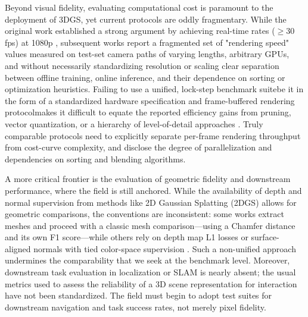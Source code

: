 \documentclass[11pt,a4paper]{article}
\begin{document}
Beyond visual fidelity, evaluating computational cost is paramount to the deployment of 3DGS, yet current protocols are oddly fragmentary. While the original work established a strong argument by achieving real-time rates ($\geq$30 fps) at 1080p \cite{arxiv:2308.04079v1}, subsequent works report a fragmented set of "rendering speed" values measured on test-set camera paths of varying lengths, arbitrary GPUs, and without necessarily standardizing resolution or scaling clear separation between offline training, online inference, and their dependence on sorting or optimization heuristics. Failing to use a unified, lock-step benchmark suitebe it in the form of a standardized hardware specification and frame-buffered rendering protocolmakes it difficult to equate the reported efficiency gains from pruning, vector quantization, or a hierarchy of level-of-detail approaches \cite{arxiv:2406.12080v1,arxiv:2406.17074v1,arxiv:2503.18682v2}. Truly comparable protocols need to explicitly separate per-frame rendering throughput from cost-curve complexity, and disclose the degree of parallelization and dependencies on sorting and blending algorithms.

A more critical frontier is the evaluation of geometric fidelity and downstream performance, where the field is still anchored. While the availability of depth and normal supervision from methods like 2D Gaussian Splatting (2DGS) allows for geometric comparisons, the conventions are inconsistent: some works extract meshes and proceed with a classic mesh comparison---using a Chamfer distance and its own F1 score---while others rely on depth map L1 losses or surface-aligned normals with tied color-space supervision \cite{arxiv:2403.17888v1}. Such a non-unified approach undermines the comparability that we seek at the benchmark level. Moreover, downstream task evaluation in localization or SLAM is nearly absent; the usual metrics used to assess the reliability of a 3D scene representation for interaction have not been standardized. The field must begin to adopt test suites for downstream navigation and task success rates, not merely pixel fidelity.
\end{document}
